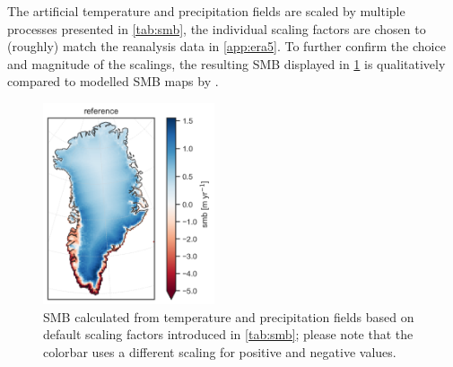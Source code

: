 The artificial temperature and precipitation fields are scaled by multiple processes presented in \cref{tab:smb}, the individual scaling factors are chosen to (roughly) match the reanalysis data in \cref{app:era5}. To further confirm the choice and magnitude of the scalings, the resulting SMB displayed in \cref{fig:smb-ref} is qualitatively compared to modelled SMB maps by \textcite{fettweis2020}.

\begin{figure}[H]
	\centering
	\includegraphics[width=0.45\textwidth]{../../climate-change-scenarios/smb-map-reference.png}
	\caption{SMB calculated from temperature and precipitation fields based on default scaling factors introduced in \cref{tab:smb}; please note that the colorbar uses a different scaling for positive and negative values.}
	\label{fig:smb-ref}
\end{figure}
